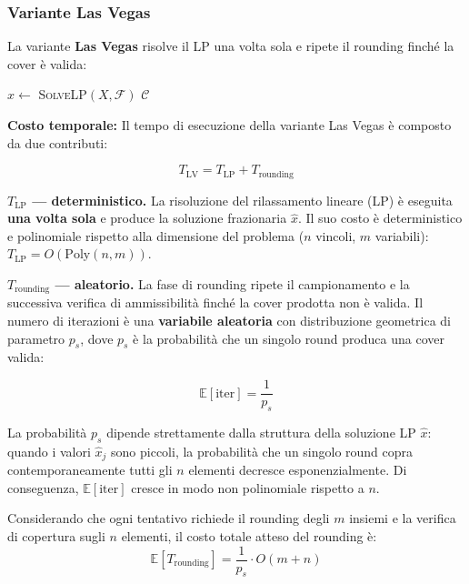 \documentclass[12pt, a4paper]{article}
\begin{document}
\subsubsection*{Variante Las Vegas}

La variante \textbf{Las Vegas} risolve il LP una volta sola e ripete 
il rounding finch\'e la cover \`e valida:

\begin{algorithm}[H]
\caption{Randomized Rounding Set Cover (Las Vegas) - pseudocodice}
$\hat{x} \leftarrow$ \textsc{SolveLP}$(X, \mathcal{F})$\;
\Return $\mathcal{C}$\;
\end{algorithm}

\textbf{Costo temporale:} 
Il tempo di esecuzione della variante Las Vegas \`e composto da due contributi:

$$T_{\text{LV}} = T_{\text{LP}} + T_{\text{rounding}}$$

\textbf{$T_{\text{LP}}$ — deterministico.}
La risoluzione del rilassamento lineare (LP) \`e eseguita \textbf{una volta sola} e produce la 
soluzione frazionaria $\hat{x}$. Il suo costo \`e deterministico e polinomiale rispetto 
alla dimensione del problema ($n$ vincoli, $m$ variabili): $T_{\text{LP}} = O(\text{Poly}(n, m))$.

\textbf{$T_{\text{rounding}}$ — aleatorio.}
La fase di rounding ripete il campionamento e la successiva verifica di ammissibilit\`a finch\'e 
la cover prodotta non \`e valida. Il numero di iterazioni \`e una \textbf{variabile aleatoria} con 
distribuzione geometrica di parametro $p_s$, dove $p_s$ \`e la probabilit\`a che un 
singolo round produca una cover valida:

$$\mathbb{E}[\text{iter}] = \frac{1}{p_s}$$

La probabilit\`a $p_s$ dipende strettamente dalla struttura della soluzione LP $\hat{x}$: quando 
i valori $\hat{x}_j$ sono piccoli, la probabilit\`a che un singolo round copra contemporaneamente 
tutti gli $n$ elementi decresce esponenzialmente. Di conseguenza, $\mathbb{E}[\text{iter}]$ cresce 
in modo non polinomiale rispetto a $n$.

Considerando che ogni tentativo richiede il rounding degli $m$ insiemi e la verifica di copertura 
sugli $n$ elementi, il costo totale atteso del rounding \`e:
$$\mathbb{E}[T_{\text{rounding}}] = \frac{1}{p_s} \cdot O(m + n)$$
\end{document}
